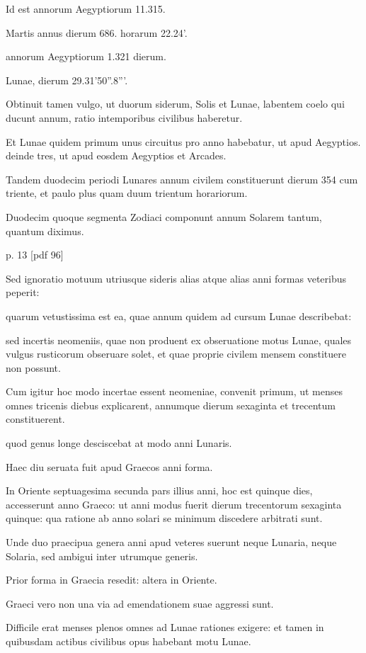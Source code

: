 Id est annorum Aegyptiorum 11.315.

Martis annus dierum
686. horarum 22.24'.

annorum Aegyptiorum 1.321 dierum.

Lunae,
dierum 29.31'50''.8'''.

Obtinuit tamen vulgo, ut duorum siderum,
Solis et Lunae, labentem coelo qui ducunt annum, ratio intemporibus
civilibus haberetur.

Et Lunae quidem primum unus circuitus
pro anno habebatur, ut apud Aegyptios. deinde tres, ut apud eosdem
Aegyptios et Arcades.

Tandem duodecim periodi Lunares annum
civilem constituerunt dierum 354 cum triente, et paulo plus quam
duum trientum horariorum.

Duodecim quoque segmenta Zodiaci
componunt annum Solarem tantum, quantum diximus.


p. 13 [pdf 96]

Sed ignoratio
motuum utriusque sideris alias atque alias anni formas veteribus
peperit:

quarum vetustissima est ea, quae annum quidem ad cursum
Lunae describebat:

sed incertis neomeniis, quae non produent ex obseruatione
motus Lunae, quales vulgus rusticorum obseruare solet, et
quae proprie civilem mensem constituere non possunt.

Cum igitur
hoc modo incertae essent neomeniae, convenit primum, ut menses omnes
tricenis diebus explicarent, annumque dierum sexaginta et trecentum
constituerent.

quod genus longe desciscebat at modo anni
Lunaris.

Haec diu seruata fuit apud Graecos anni forma.

In Oriente
septuagesima secunda pars illius anni, hoc est quinque dies, accesserunt
anno Graeco: ut anni modus fuerit dierum trecentorum sexaginta quinque:
qua ratione ab anno solari se minimum discedere arbitrati sunt.

Unde duo praecipua genera anni apud veteres suerunt neque Lunaria,
neque Solaria, sed ambigui inter utrumque generis.

Prior forma in Graecia resedit: altera in Oriente.

Graeci vero non una via ad emendationem
suae aggressi sunt.

Difficile erat menses plenos omnes ad
Lunae rationes exigere: et tamen in quibusdam actibus civilibus opus
habebant motu Lunae.

